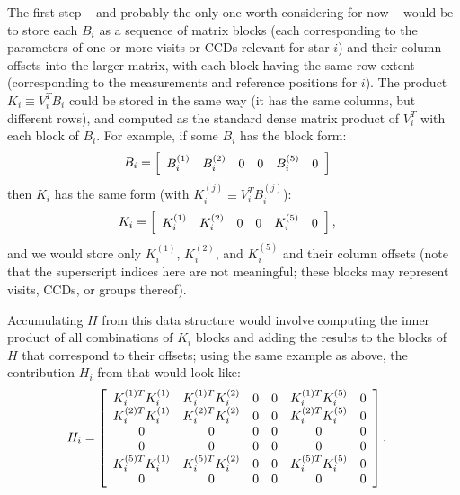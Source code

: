 The first step -- and probably the only one worth considering for now -- would be to store each $B_i$ as a sequence of matrix blocks (each corresponding to the parameters of one or more visits or CCDs relevant for star $i$) and their column offsets into the larger matrix, with each block having the same row extent (corresponding to the measurements and reference positions for $i$).
The product $K_i \equiv V_i^T B_i$ could be stored in the same way (it has the same columns, but different rows), and computed as the standard dense matrix product of $V_i^T$ with each block of $B_i$.
For example, if some $B_i$ has the block form:
\begin{align}
    B_i &= \left[
        \begin{array}{ c c c c c c }
            B_i^{(1)} & B_i^{(2)} & 0 & 0 & B_i^{(5)} & 0
        \end{array}
    \right]
\end{align}
then $K_i$ has the same form (with $K_i^{(j)} \equiv V_i^T B_i^{(j)}$):
\begin{align}
    K_i &= \left[
        \begin{array}{ c c c c c c }
            K_i^{(1)} & K_i^{(2)} & 0 & 0 & K_i^{(5)} & 0
        \end{array}
    \right],
\end{align}
and we would store only $K_i^{(1)}$, $K_i^{(2)}$, and $K_i^{(5)}$ and their column offsets (note that the superscript indices here are not meaningful; these blocks may represent visits, CCDs, or groups thereof).

Accumulating $H$ from this data structure would involve computing the inner product of all combinations of $K_i$ blocks and adding the results to the blocks of $H$ that correspond to their offsets; using the same example as above, the contribution $H_i$ from that  would look like:
\begin{align}
    H_i &= \left[
        \begin{array}{ c c c c c c }
            K_i^{(1) T} K_i^{(1)} & K_i^{(1) T} K_i^{(2)} & 0 & 0 & K_i^{(1) T} K_i^{(5)} & 0 \\
            K_i^{(2) T} K_i^{(1)} & K_i^{(2) T} K_i^{(2)} & 0 & 0 & K_i^{(2) T} K_i^{(5)} & 0 \\
            0 & 0 & 0 & 0 & 0 & 0 \\
            0 & 0 & 0 & 0 & 0 & 0 \\
            K_i^{(5) T} K_i^{(1)} & K_i^{(5) T} K_i^{(2)} & 0 & 0 & K_i^{(5) T} K_i^{(5)} & 0 \\
            0 & 0 & 0 & 0 & 0 & 0
        \end{array}
    \right].
\end{align}

